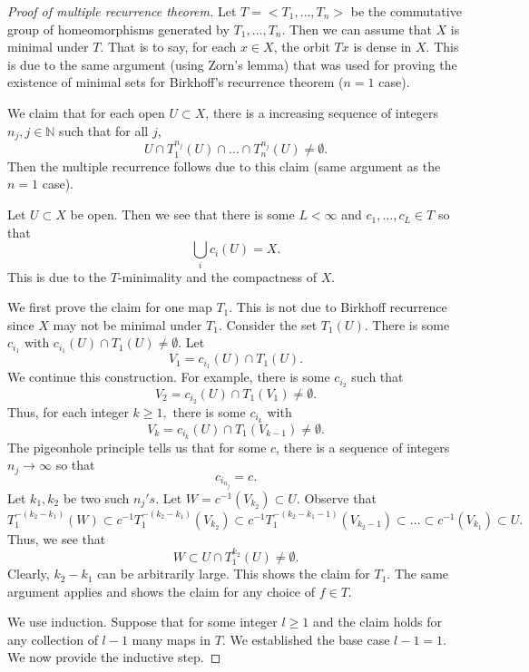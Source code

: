 \documentclass[12pt]{article}
\theoremstyle{definition}
\theoremstyle{remark}
\begin{document}
\begin{proof}[Proof of multiple recurrence theorem]
    Let $T=<T_1,\dots,T_n>$ be the commutative group of homeomorphisms generated by $T_1,\dots,T_n$. Then we can assume that $X$ is minimal under $T$. That is to say, for each $x\in X$, the orbit $Tx$ is dense in $X.$ This is due to the same argument (using Zorn's lemma) that was used for proving the existence of minimal sets for Birkhoff's recurrence theorem ($n=1$ case).

    We claim that for each open $U\subset X$, there is a increasing sequence of integers $n_j,j\in\mathbb{N}$ such that for all $j$,
\[
U\cap T^{n_j}_1(U)\cap\dots\cap T^{n_j}_n(U)\neq\emptyset.
\]
Then the multiple recurrence follows due to this claim (same argument as the $n=1$ case).

    Let $U\subset X$ be open. Then we see that there is some $L<\infty$ and $c_1,\dots,c_L\in T$ so that 
    \[
    \bigcup_{i} c_i(U)=X.
    \]
    This is due to the $T$-minimality and the compactness of $X$.

    We first prove the claim for one map $T_1$. This is not due to Birkhoff recurrence since $X$ may not be minimal under $T_1$. Consider the set $T_1(U)$. There is some $c_{i_1}$ with $c_{i_1}(U)\cap T_1(U)\neq\emptyset.$ Let
    \[
    V_1=c_{i_1}(U)\cap T_1(U).
    \]
    We continue this construction. For example, there is some $c_{i_2}$ such that
    \[
    V_2=c_{i_2}(U)\cap T_1(V_1)\neq\emptyset.
    \]
    Thus, for each integer $k\geq 1,$ there is some $c_{i_k}$ with
    \[
    V_k=c_{i_k}(U)\cap T_1(V_{k-1})\neq\emptyset.
    \]
    The pigeonhole principle tells us that for some $c$, there is a sequence of integers $n_j\to\infty$ so that
    \[
    c_{i_{n_j}}=c.
    \]
    Let $k_1,k_2$ be two such $n_j's$. Let $W=c^{-1}(V_{k_2})\subset U.$ Observe that
    \[
    T^{-(k_2-k_1)}_{1}(W)\subset c^{-1}T^{-(k_2-k_1)}_1(V_{k_2})\subset c^{-1}T^{-(k_2-k_1-1)}_1(V_{k_2-1})\subset\dots\subset c^{-1}(V_{k_1})\subset U.
    \]
    Thus, we see that
    \[
    W\subset U\cap T^{k_2}_1(U)\neq\emptyset.
    \]
    Clearly, $k_2-k_1$ can be arbitrarily large. This shows the claim for $T_1$. The same argument applies and shows the claim for any choice of $f\in T$.

    We use induction. Suppose that for some integer $l\geq 1$ and the claim holds for any collection of $l-1$ many maps in $T$. We established the base case $l-1=1$. We now provide the inductive step.


\end{proof}
\end{document}
